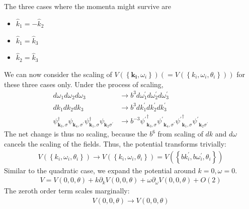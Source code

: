 \documentclass[14pt]{extarticle}
\begin{document}
The three cases where the momenta might survive are
\begin{itemize}
	\item \(\hat k_1 = - \hat k_2\)\\
	\item \(\hat k_1 = \hat k_3\)\\
	\item \(\hat k_2 = \hat k_3\)
\end{itemize}
We can now consider the scaling of \(V(\left\{\mathbf{k_i},\omega_i\right\}) (= V\left(\left\{k_i,\omega_i,\theta_i\right\}\right))\) for these three cases only. Under the process of scaling,
\begin{equation}\begin{aligned}
d\omega_1 d\omega_2 d\omega_3 &\rightarrow b^{3}d\omega^\prime_1 d\omega^\prime_2 d\omega^\prime_3\\
dk_1 dk_2 dk_3 &\rightarrow b^{3}dk^\prime_1 dk^\prime_2 dk^\prime_3\\
\psi_{\mathbf k_3,\sigma}^\dagger\psi_{\mathbf k_4,\sigma^\prime}\psi_{\mathbf k_1,\sigma}^\dagger\psi_{\mathbf k_2\sigma^\prime} &\rightarrow b^{-3}{\psi^\prime}_{\mathbf k_3,\sigma}^\dagger{\psi^\prime}_{\mathbf k_4,\sigma^\prime}{\psi^\prime}_{\mathbf k_1,\sigma}^\dagger{\psi^\prime}_{\mathbf k_2\sigma^\prime}
\end{aligned}\end{equation}
The net change is thus no scaling, because the \(b^6\) from scaling of \(dk\) and \(d\omega\) cancels the scaling of the fields. Thus, the potential transforms trivially:
\begin{equation}\begin{aligned}
	V(\left\{k_i,\omega_i,\theta_i\right\}) \rightarrow V(\left\{k_i,\omega_i,\theta_i\right\}) = V(\left\{b k_i^\prime,b \omega_i^\prime,\theta_i\right\})
\end{aligned}\end{equation}
Similar to the quadratic case, we expand the potential around \(k=0,\omega=0\).
\begin{equation}\begin{aligned}
V = V(0,0,\theta) + k \partial_k V(0,0,\theta) + \omega \partial_\omega V(0,0,\theta) + O(2)
\end{aligned}\end{equation}
The zeroth order term scales marginally:
\begin{equation}\begin{aligned}
V(0,0,\theta) \rightarrow V(0,0,\theta)
\end{aligned}\end{equation}
\end{document}

